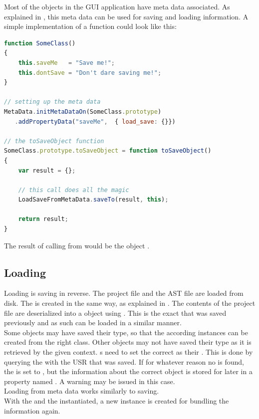 Most of the objects in the GUI application have meta data associated. As explained in , this meta data can be used for saving and loading information. A simple implementation of a  function could look like this:

\SingleSpacing
\begin{lstlisting}[language=JavaScript, caption=Saving using meta data, label=lst:MetaDataSave]
function SomeClass()
{
	this.saveMe   = "Save me!";
	this.dontSave = "Don't dare saving me!";
}

// setting up the meta data
MetaData.initMetaDataOn(SomeClass.prototype)
   .addPropertyData("saveMe",  { load_save: {}})

// the toSaveObject function
SomeClass.prototype.toSaveObject = function toSaveObject()
{
	var result = {};
	
	// this call does all the magic
	LoadSaveFromMetaData.saveTo(result, this);
	
	return result;
}
\end{lstlisting}
\OnehalfSpacing

The result of calling  from  would be the  object .

\subsection{Loading}

Loading is saving in reverse. The project file and the  AST file are loaded from disk. The  is created in the same way, as explained in . The contents of the project file are deserialized into a  object using . This is the exact  that was saved previously and as such can be loaded in a similar manner.\\
Some objects may have saved their type, so that the according instances can be created from the right class. Other objects may not have saved their type as it is retrieved by the given context. s need to set the correct  as their . This is done by querying the  with the USR that was saved. If for whatever reason no  is found, the  is set to , but the information about the correct object is stored for later in a property named . A warning may be issued in this case.\\
Loading from meta data works similarly to saving.\\
With the  and the  instantiated, a new  instance is created for bundling the information again.

